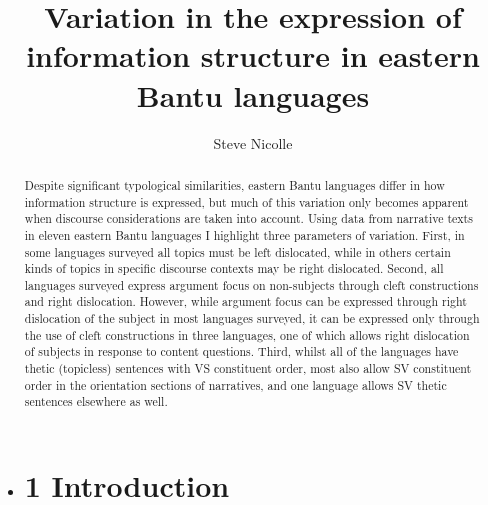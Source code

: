 \documentclass[output=paper]{langsci/langscibook}
\title{Variation in the expression of information structure in eastern {Bantu} languages}
\author{%
Steve Nicolle\affiliation{Canada Institute of Linguistics / SIL International} 
}
\begin{document}
\begin{abstract}
Despite significant typological similarities, eastern Bantu languages differ in how information structure is expressed, but much of this variation only becomes apparent when discourse considerations are taken into account. Using data from narrative texts in eleven eastern Bantu languages I highlight three parameters of variation. First, in some languages surveyed all topics must be left dislocated, while in others certain kinds of topics in specific discourse contexts may be right dislocated. Second, all languages surveyed express argument focus on non-subjects through cleft constructions and right dislocation. However, while argument focus can be expressed through right dislocation of the subject in most languages surveyed, it can be expressed only through the use of cleft constructions in three languages, one of which allows right dislocation of subjects in response to content questions. Third, whilst all of the languages have thetic (topicless) sentences with VS constituent order, most also allow SV constituent order in the orientation sections of narratives, and one language allows SV thetic sentences elsewhere as well.
\end{abstract}

\begin{itemize}
\item \section{1  Introduction}\end{itemize}
\end{document}
